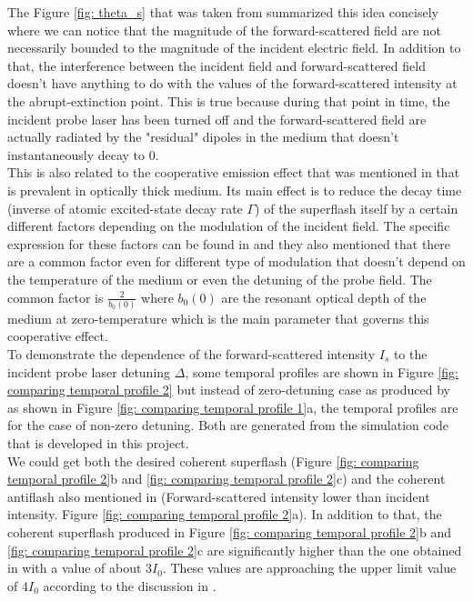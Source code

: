 The Figure \ref{fig: theta_s} that was taken from \cite{Kwong2014} summarized this idea concisely where we can notice that the magnitude of the forward-scattered field are not necessarily bounded to the magnitude of the incident electric field. In addition to that, the interference between the incident field and forward-scattered field doesn't have anything to do with the values of the forward-scattered intensity at the abrupt-extinction point. This is true because during that point in time, the incident probe laser has been turned off and the forward-scattered field are actually radiated by the "residual" dipoles in the medium that doesn't instantaneously decay to $0$.\\

This is also related to the cooperative emission effect that was mentioned in \cite{Kwong2014, Kwong2015, Kwong2017, Araujo2016} that is prevalent in optically thick medium. Its main effect is to reduce the decay time (inverse of atomic excited-state decay rate $\Gamma$) of the superflash itself by a certain different factors depending on the modulation of the incident field. The specific expression for these factors can be found in \cite{Kwong2017} and they also mentioned that there are a common factor even for different type of modulation that doesn't depend on the temperature of the medium or even the detuning of the probe field. The common factor is $\frac{2}{b_{0}(0)}$ where $b_{0}(0)$ are the resonant optical depth of the medium at zero-temperature which is the main parameter that governs this cooperative effect.\\

To demonstrate the dependence of the forward-scattered intensity $I_{s}$ to the incident probe laser detuning $\Delta$, some temporal profiles are shown in Figure \ref{fig: comparing temporal profile 2} but instead of zero-detuning case as produced by \cite{jeong2010slow} as shown in Figure \ref{fig: comparing temporal profile 1}a, the temporal profiles are for the case of non-zero detuning. Both are generated from the simulation code that is developed in this project.\\

We could get both the desired coherent superflash (Figure \ref{fig: comparing temporal profile 2}b and \ref{fig: comparing temporal profile 2}c) and the coherent antiflash also mentioned in \cite{Kwong2017} (Forward-scattered intensity lower than incident intensity. Figure \ref{fig: comparing temporal profile 2}a). In addition to that, the coherent superflash produced in Figure \ref{fig: comparing temporal profile 2}b and \ref{fig: comparing temporal profile 2}c are significantly higher than the one obtained in \cite{jeong2010slow} with a value of about $3I_{0}$. These values are approaching the upper limit value of $4I_{0}$ according to the discussion in \cite{Kwong2014}.

